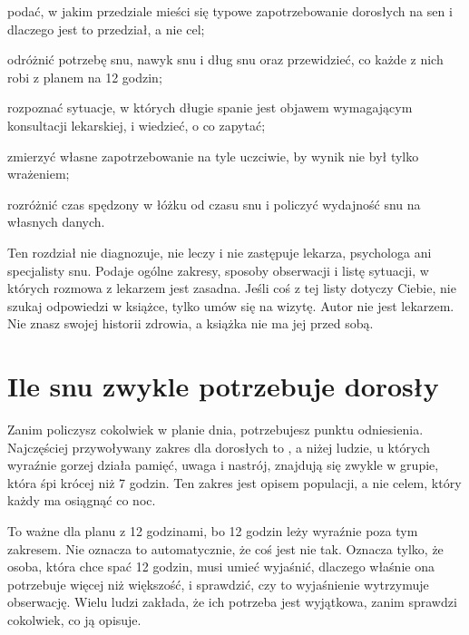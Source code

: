 
\begin{cele}
  \item podać, w jakim przedziale mieści się typowe zapotrzebowanie dorosłych na sen i dlaczego jest to przedział, a nie cel;
  \item odróżnić potrzebę snu, nawyk snu i dług snu oraz przewidzieć, co każde z nich robi z planem na 12 godzin;
  \item rozpoznać sytuacje, w których długie spanie jest objawem wymagającym konsultacji lekarskiej, i wiedzieć, o co zapytać;
  \item zmierzyć własne zapotrzebowanie na tyle uczciwie, by wynik nie był tylko wrażeniem;
  \item rozróżnić czas spędzony w łóżku od czasu snu i policzyć wydajność snu na własnych danych.
\end{cele}

\begin{uwaga}
  Ten rozdział nie diagnozuje, nie leczy i nie zastępuje lekarza, psychologa ani specjalisty snu. Podaje ogólne zakresy, sposoby obserwacji i listę sytuacji, w których rozmowa z lekarzem jest zasadna. Jeśli coś z tej listy dotyczy Ciebie, nie szukaj odpowiedzi w książce, tylko umów się na wizytę. Autor nie jest lekarzem. Nie znasz swojej historii zdrowia, a książka nie ma jej przed sobą.
\end{uwaga}

\section{Ile snu zwykle potrzebuje dorosły}

Zanim policzysz cokolwiek w planie dnia, potrzebujesz punktu odniesienia. Najczęściej przywoływany zakres dla dorosłych to , a niżej ludzie, u których wyraźnie gorzej działa pamięć, uwaga i nastrój, znajdują się zwykle w grupie, która śpi krócej niż 7 godzin. Ten zakres jest opisem populacji, a nie celem, który każdy ma osiągnąć co noc.

To ważne dla planu z 12 godzinami, bo 12 godzin leży wyraźnie poza tym zakresem. Nie oznacza to automatycznie, że coś jest nie tak. Oznacza tylko, że osoba, która chce spać 12 godzin, musi umieć wyjaśnić, dlaczego właśnie ona potrzebuje więcej niż większość, i sprawdzić, czy to wyjaśnienie wytrzymuje obserwację. Wielu ludzi zakłada, że ich potrzeba jest wyjątkowa, zanim sprawdzi cokolwiek, co ją opisuje.

